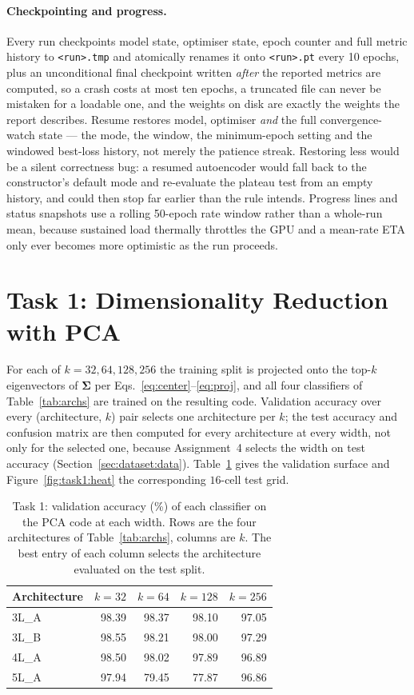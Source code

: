 \documentclass[11pt,a4paper]{article}
\newcommand{\code}[1]{\texttt{#1}}
\begin{document}
\paragraph{Checkpointing and progress.}
Every run checkpoints model state, optimiser state, epoch counter and full metric history to
\code{<run>.tmp} and atomically renames it onto \code{<run>.pt} every 10 epochs, plus an
unconditional final checkpoint written \emph{after} the reported metrics are computed, so a crash
costs at most ten epochs, a truncated file can never be mistaken for a loadable one, and the
weights on disk are exactly the weights the report describes.  Resume restores model, optimiser
\emph{and} the full convergence-watch state --- the mode, the window, the minimum-epoch setting and
the windowed best-loss history, not merely the patience streak.  Restoring less would be a silent
correctness bug: a resumed autoencoder would fall back to the constructor's default mode and
re-evaluate the plateau test from an empty history, and could then stop far earlier than the rule
intends.  Progress lines and status snapshots use a rolling 50-epoch rate window
rather than a whole-run mean, because sustained load thermally throttles the
GPU and a mean-rate ETA only ever becomes more optimistic as the run proceeds.

\section{Task 1: Dimensionality Reduction with PCA}\label{sec:task1}
For each of $k=32,64,128,256$ the training split is projected onto the top-$k$ eigenvectors of
$\boldsymbol{\Sigma}$ per Eqs.~\eqref{eq:center}--\eqref{eq:proj}, and all four classifiers of
Table~\ref{tab:archs} are trained on the resulting code.  Validation accuracy over every
(architecture, $k$) pair selects one architecture per $k$; the test accuracy and confusion matrix
are then computed for every architecture at every width, not only for the selected one, because
Assignment~4 selects the width on test accuracy
(Section~\ref{sec:dataset:data}).  Table~\ref{tab:task1} gives the validation surface and
Figure~\ref{fig:task1:heat} the corresponding $16$-cell test grid.

\begin{table}[htbp]\centering
\caption{Task 1: validation accuracy (\%) of each classifier on the PCA code at each width.  Rows
are the four architectures of Table~\ref{tab:archs}, columns are $k$.  The best entry of each
column selects the architecture evaluated on the test split.}\label{tab:task1}
\begin{tabular}{@{}lrrrr@{}}
\toprule Architecture & $k=32$ & $k=64$ & $k=128$ & $k=256$ \\ \midrule
3L\_A & 98.39 & 98.37 & 98.10 & 97.05 \\
3L\_B & 98.55 & 98.21 & 98.00 & 97.29 \\
4L\_A & 98.50 & 98.02 & 97.89 & 96.89 \\
5L\_A & 97.94 & 79.45 & 77.87 & 96.86 \\
\bottomrule
\end{tabular}
\end{table}
\end{document}
